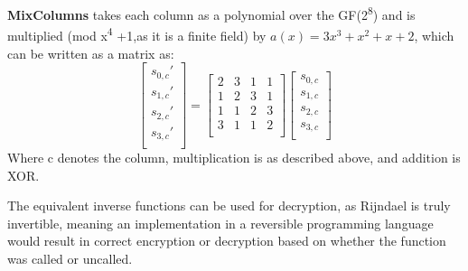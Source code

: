 \documentclass[a4paper, openany]{memoir}
\begin{document}
\begin{abstact}
\textbf{MixColumns} takes each column as a polynomial over the GF(2\textsuperscript{8}) and is multiplied (mod x\textsuperscript{4} +1,as it is a finite field) by \(a(x) = 3x^3 + x^2 + x + 2\), which can be written as a matrix as:
\[
\begin{bmatrix}
 s_{0,c}' \\
 s_{1,c}' \\
 s_{2,c}' \\
 s_{3,c}' \\
\end{bmatrix}=
\begin{bmatrix}
 2 & 3 & 1 & 1 \\
 1 & 2 & 3 & 1 \\
 1 & 1 & 2 & 3 \\
 3 & 1 & 1 & 2 \\
\end{bmatrix}
\begin{bmatrix}
 s_{0,c} \\
 s_{1,c} \\
 s_{2,c} \\
 s_{3,c} \\
\end{bmatrix}
\]
Where c denotes the column, multiplication is as described above, and addition is XOR.

The equivalent inverse functions can be used for decryption, as Rijndael is truly invertible, meaning an implementation in a reversible programming language would result in correct encryption or decryption based on whether the function was called or uncalled.


\end{abstact}
\end{document}
